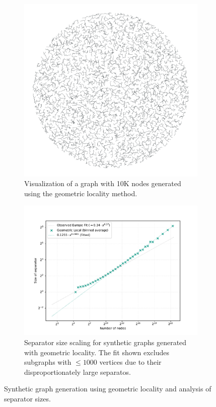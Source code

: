 \begin{figure}[tbhp]
    \begin{subfigure}{0.35\linewidth}
        \centering
        \includegraphics[width=\linewidth]{graphics/local_embedding.png}
        \caption{Visualization of a graph with 10K nodes generated using the geometric locality method.}
        \label{fig:geometric_locality_graph_viz}
    \end{subfigure}
    \hfill
    \begin{subfigure}{0.55\linewidth}
        \centering
        \includegraphics[width=\linewidth]{graphics/sep_local_embedding.pdf}
        \caption{Separator size scaling for synthetic graphs generated with geometric locality. The fit shown excludes subgraphs with \( \le 1000 \) vertices due to their disproportionately large separatos.}
        \label{fig:geometric_locality_sep_plot}
    \end{subfigure}
    \caption{Synthetic graph generation using geometric locality and analysis of separator sizes. }
    \label{fig:geometric_locality_separators}
\end{figure}

